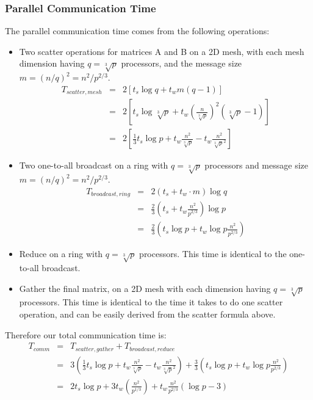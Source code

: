 \documentclass{article}
\begin{document}
\subsubsection{Parallel Communication Time}

The parallel communication time comes from the following operations:
\begin{itemize}
  \item Two scatter operations for matrices A and B on a 2D mesh, with each mesh dimension having $q = \sqrt[3]{p}$ processors, 
  and the message size $m = (n/q)^2 = n^2/p^{2/3}$.
	\begin{eqnarray*}
  			T_{{scatter},{mesh}} &=& 2 \left[ t_s \log{q} + t_w  m (q-1) \right] \\
  								 &=& 2 \left[ t_s \log{\sqrt[3]{p}} + t_w \left( \frac{n}{\sqrt[3]{p}} \right)^2 (\sqrt[3]{p} - 1) \right] \\
   								 &=& 2 \left[ \frac{1}{3} t_s  \log{p} + t_w  \frac{n^2}{\sqrt[3]{p}} - t_w \frac{n^2}{\sqrt[3]{p}^2}  \right]		 
  	\end{eqnarray*}
  \item Two one-to-all broadcast on a ring with $q = \sqrt[3]{p}$ processors and message size $m = (n/q)^2 = n^2/p^{2/3}$.
  	\begin{eqnarray*}
  		 T_{{broadcast},{ring}} &=& 2 (t_s + t_w\cdot m) \log{q} \\
  		 						&=& \frac{2}{3} \left(t_s + t_w \frac{n^2}{p^{2/3}}\right) \log{p} \\
  		 						&=& \frac{2}{3} \left( t_s \log{p} + t_w \log{p} \frac{n^2}{p^{2/3}} \right)
  	\end{eqnarray*}
  \item Reduce on a ring with $q = \sqrt[3]{p}$ processors.  This time is identical to the one-to-all broadcast.
  \item Gather the final matrix, on a 2D mesh with each dimension having $q = \sqrt[3]{p}$ processors.  This time is identical 
  to the time it takes to do one scatter operation, and can be easily derived from the scatter formula above.
\end{itemize}

Therefore our total communication time is:
\begin{eqnarray*}
T_{{comm}} &=& T_{{scatter},{gather}} + T_{{broadcast},{reduce}} \\
		   &=& 3 \left( \frac{1}{3} t_s  \log{p} + t_w  \frac{n^2}{\sqrt[3]{p}} - t_w \frac{n^2}{\sqrt[3]{p}^2}  \right) +
		     \frac{3}{3} \left( t_s \log{p} + t_w \log{p} \frac{n^2}{p^{2/3}} \right) \\
		   &=& 2 t_s \log{p} + 3 t_w \left( \frac{n^2}{{p}^{1/3}} \right) + t_w \frac{n^2}{p^{2/3}} (\log{p} - 3)
\end{eqnarray*}
\end{document}
